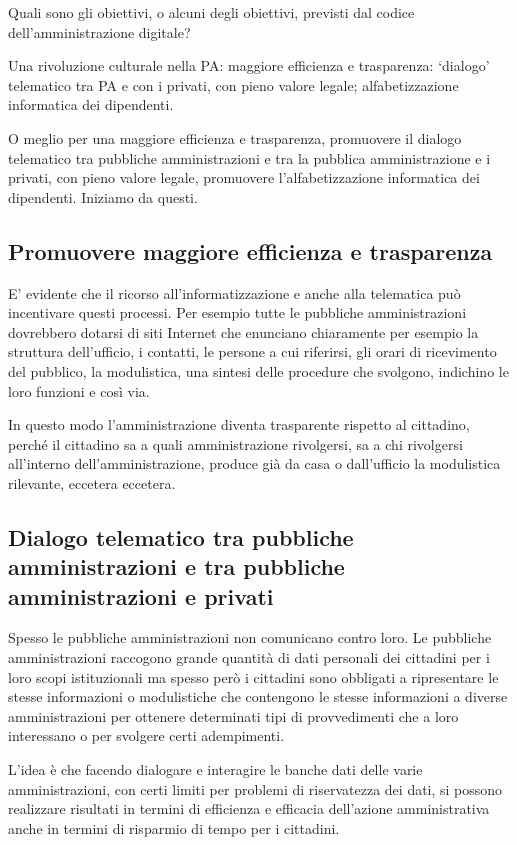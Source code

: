 Quali sono gli obiettivi, o alcuni degli obiettivi, previsti dal codice dell'amministrazione digitale? 

Una rivoluzione culturale nella PA: maggiore efficienza e trasparenza: ‘dialogo’ telematico tra PA e con i privati, con pieno valore legale; alfabetizzazione informatica dei dipendenti.

O meglio per una maggiore efficienza e trasparenza, promuovere il dialogo telematico tra pubbliche amministrazioni e tra la pubblica amministrazione e i privati, con pieno valore legale, promuovere l'alfabetizzazione informatica dei dipendenti. 
Iniziamo da questi. 
\subsection{Promuovere maggiore efficienza e trasparenza}

E' evidente che il ricorso all'informatizzazione e anche alla telematica può incentivare questi processi. Per esempio tutte le pubbliche amministrazioni dovrebbero dotarsi di siti Internet che enunciano chiaramente per esempio la struttura dell'ufficio, i contatti, le persone a cui riferirsi, gli orari di ricevimento del pubblico, la modulistica, una sintesi delle procedure che svolgono, indichino le loro funzioni e così via.

In questo modo l'amministrazione diventa trasparente rispetto al cittadino, perché il cittadino sa a quali amministrazione rivolgersi, sa a chi rivolgersi all'interno dell'amministrazione, produce già da casa o dall'ufficio la modulistica rilevante, eccetera eccetera.

\subsection{Dialogo telematico tra pubbliche amministrazioni e tra pubbliche amministrazioni e privati}

Spesso le pubbliche amministrazioni non comunicano contro loro. Le pubbliche amministrazioni raccogono grande quantità di dati personali dei cittadini per i loro scopi istituzionali ma spesso però i cittadini sono obbligati a ripresentare le stesse informazioni o modulistiche che contengono le stesse informazioni a diverse amministrazioni per ottenere determinati tipi di provvedimenti che a loro interessano o per svolgere certi adempimenti. 

L'idea è che facendo dialogare e interagire le banche dati delle varie amministrazioni, con certi limiti per problemi di riservatezza dei dati, si possono realizzare risultati in termini di efficienza e efficacia dell'azione amministrativa anche in termini di risparmio di tempo per i cittadini. 

